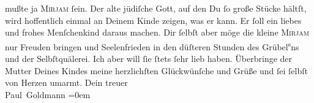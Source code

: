 \begin{ledgroupsized}[t]{13cm}
               mußte ja \textsc{Mirjam} ſein.\pend
           \pstart
           Der alte jüdiſche Gott, auf den Du ſo große Stücke hältſt,  wird hoffentlich einmal an Deinem Kinde zeigen, was er kann. Er ſoll
               ein {\pb}liebes und frohes Menſchenkind daraus
               machen. Dir ſelbſt aber möge die kleine \textsc{Mirjam}{ } nur Freuden bringen und Seelenfrieden in den düſteren Stunden des Grübel\substVorne{}\textsuperscript{s}\substDazwischen{}n\substHinten{}s und der Selbſtquälerei.\pend
           \pstart
           Ich \strikeout{\textcolor{gray}{×}\-\textcolor{gray}{×}\-\textcolor{gray}{×}\-\textcolor{gray}{×}} aber will ſie ſtets ſehr lieb haben.\pend
           \pstart
           Überbringe der Mutter Deines
                  Kindes meine herzlichſten
               Glückwünſche und Grüße und ſei ſelbſt von Herzen umarmt.\pend
           \pstart
           Dein treuer{\\[\baselineskip]}\spacefill\mbox{Paul Goldmann}\pend
           \leftskip=0em{}
         
         \endnumbering{}\end{ledgroupsized}  \newcommand{\dateiname}{L02823}\newcommand{\titel}{Paul Goldmann an Arthur Schnitzler, 13. 9. 1897}\newcommand{\editorInnen}{Martin Anton Müller und Laura Untner}
      